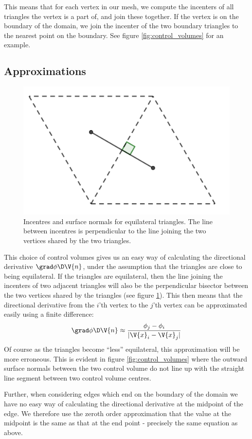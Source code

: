\documentclass[sigconf]{acmart}
\begin{document}
This means that for each vertex in our mesh, we compute the incenters of all triangles the vertex is a part of, and join these together. If the vertex is on the boundary of the domain, we join the incenter of the two boundary triangles to the nearest point on the boundary. See figure \ref{fig:control_volumes} for an example.


\subsection{Approximations}
\begin{figure}
	\centering
	\includegraphics[width=0.7\linewidth]{triangles.png}
	\caption{Incentres and surface normals for equilateral triangles. The line between incentres is perpendicular to the line joining the two vertices shared by the two triangles.}
	\label{fig:triangles}
\end{figure}
This choice of control volumes gives us an easy way of calculating the directional derivative $ \grad\phi \D \V{n} $, under the assumption that the triangles are close to being equilateral. If the triangles are equilateral, then the line joining the incenters of two adjacent triangles will also be the perpendicular bisector between the two vertices shared by the triangles (see figure \ref{fig:triangles}). This then means that the directional derivative from the $ i $'th vertex to the $ j $'th vertex can be approximated easily using a finite difference:
\begin{equation}\label{key}
	\grad \phi \D \V{n} \approx \frac{\phi_j - \phi_i}{|\V{x}_i-\V{x}_j|}
\end{equation}
Of course as the triangles become ``less'' equilateral, this approximation will be more erroneous. This is evident in figure \ref{fig:control_volumes} where the outward surface normals between the two control volume do not line up with the straight line segment between two control volume centres.

Further, when considering edges which end on the boundary of the domain we have no easy way of calculating the directional derivative at the midpoint of the edge. We therefore use the zeroth order approximation that the value at the midpoint is the same as that at the end point - precisely the same equation as above.
\end{document}
